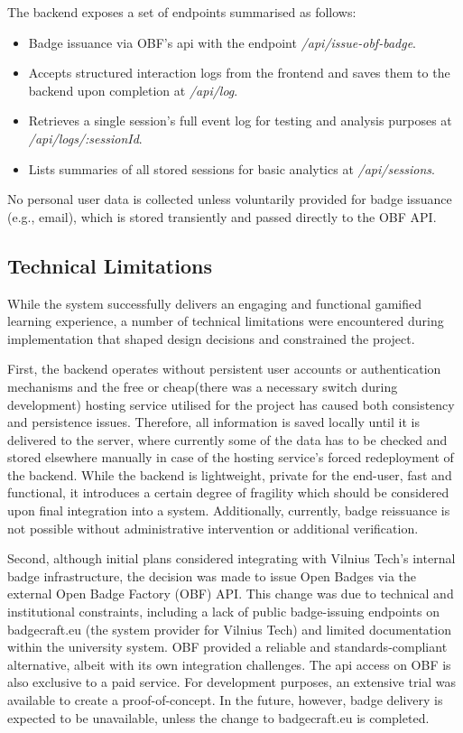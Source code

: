 The backend exposes a set of endpoints summarised as follows:
\begin{itemize}
\item Badge issuance via OBF’s \acrshort{api} with the endpoint \textit{/api/issue-obf-badge}.
\item Accepts structured interaction logs from the frontend and saves them to the backend upon completion at \textit{/api/log}.
\item Retrieves a single session’s full event log for testing and analysis purposes at \textit{/api/logs/:sessionId}.
\item Lists summaries of all stored sessions for basic analytics at \textit{/api/sessions}.
\end{itemize}
No personal user data is collected unless voluntarily provided for badge issuance (e.g., email), which is stored transiently and passed directly to the OBF API. 

\subsection{Technical Limitations}

While the system successfully delivers an engaging and functional gamified learning experience, a number of technical limitations were encountered during implementation that shaped design decisions and constrained the project.

First, the backend operates without persistent user accounts or authentication mechanisms and the free or cheap(there was a necessary switch during development) hosting service utilised for the project has caused both consistency and persistence issues. 
Therefore, all information is saved locally until it is delivered to the server, where currently some of the data has to be checked and stored elsewhere manually in case of the hosting service's forced redeployment of the backend. 
While the backend is lightweight, private for the end-user, fast and functional, it introduces a certain degree of fragility which should be considered upon final integration into a system. 
Additionally, currently, badge reissuance is not possible without administrative intervention or additional verification.

Second, although initial plans considered integrating with Vilnius Tech’s internal badge infrastructure, the decision was made to issue Open Badges via the external Open Badge Factory (OBF) API. 
This change was due to technical and institutional constraints, including a lack of public badge-issuing endpoints on badgecraft.eu (the system provider for Vilnius Tech) and limited documentation within the university system. OBF provided a reliable and standards-compliant alternative, albeit with its own integration challenges. 
The \acrshort{api} access on OBF is also exclusive to a paid service. 
For development purposes, an extensive trial was available to create a proof-of-concept. 
In the future, however, badge delivery is expected to be unavailable, unless the change to badgecraft.eu is completed.

